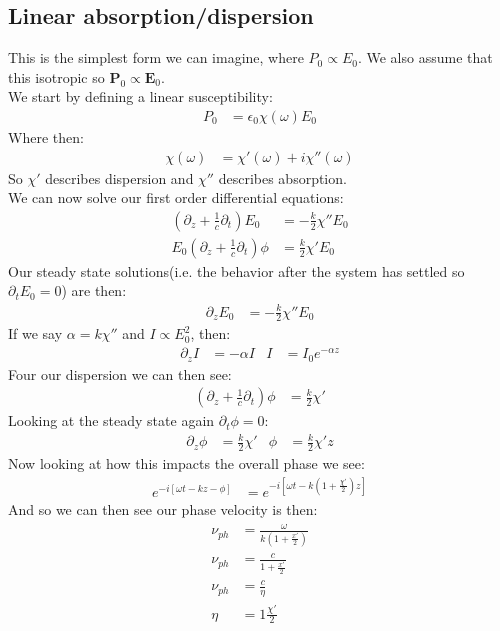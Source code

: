 \subsection{Linear absorption/dispersion}
This is the simplest form we can imagine, where $P_0 \propto E_0$. We also assume that this isotropic so $\bm{P}_0\propto\bm{E}_0$. \\
We start by defining a linear susceptibility:
\begin{align*}
	P_0 &= \epsilon_0\chi(\omega)E_0
\end{align*}
Where then:
\begin{align*}
	\chi(\omega) &= \chi'(\omega) + i\chi''(\omega)
\end{align*}
So $\chi'$ describes dispersion and $\chi''$ describes absorption. \\
We can now solve our first order differential equations:
\begin{align*}
	\left(\partial_z + \frac{1}{c}\partial_t\right)E_0 &= -\frac{k}{2} \chi'' E_0 \\
	E_0\left(\partial_z + \frac{1}{c}\partial_t\right)\phi &= \frac{k}{2} \chi' E_0
\end{align*}
Our steady state solutions(i.e. the behavior after the system has settled so $\partial_t E_0 =0$) are then:
\begin{align*}
	\partial_z E_0 &= -\frac{k}{2}\chi''E_0
\end{align*}
If we say $\alpha = k\chi''$ and $I \propto E_0^2$, then:
\begin{align*}
	\partial_z I &= -\alpha I &
	I &= I_0 e^{-\alpha z}
\end{align*}
Four our dispersion we can then see:
\begin{align*}
	\left(\partial_z + \frac{1}{c}\partial_t\right)\phi &= \frac{k}{2} \chi'
\end{align*}
Looking at the steady state again $\partial_t\phi =0$:
\begin{align*}
	\partial_z\phi &= \frac{k}{2} \chi' &
	\phi &= \frac{k}{2} \chi'z 
\end{align*}
Now looking at how this impacts the overall phase we see:
\begin{align*}
	e^{-i[\omega t- kz -\phi]} &= e^{-i\left[\omega t -k\left(1+\frac{\chi'}{2}\right)z\right]}
\end{align*}
And so we can then see our phase velocity is then:
\begin{align*}
	\nu_{ph} &= \frac{\omega}{k\left(1+\frac{x'}{2}\right)} \\
	\nu_{ph} &= \frac{c}{1+\frac{x'}{2}} \\
	\nu_{ph} &= \frac{c}{\eta} \\
	\eta &= 1 \frac{\chi'}{2}
\end{align*}
